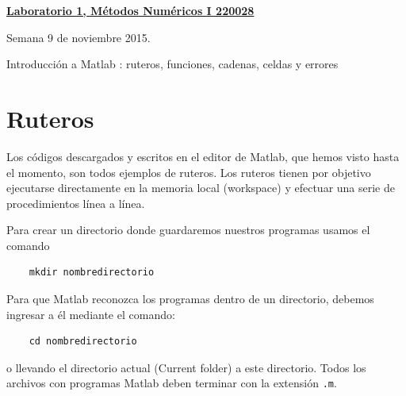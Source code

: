 \documentclass[11pt]{article}
\begin{document}
\hspace*{-1,5cm}

\vspace*{0.5cm} \centerline {\bf\underline{Laboratorio 1, M\'etodos Num\'ericos I 220028 }}
\centerline{\textrm{Semana 9 de noviembre 2015.}}  \vspace{0.2cm}




\centerline{Introducci\'on  a Matlab \circledR:  ruteros, funciones, cadenas, celdas y errores} 
%


\section{Ruteros}
  Los c\'odigos descargados y escritos en el editor de Matlab, que hemos visto hasta el momento,  son todos ejemplos de ruteros. Los ruteros tienen por objetivo ejecutarse directamente en la memoria local (workspace) y efectuar una serie de procedimientos l\'inea a l\'inea.
  
Para crear un directorio donde guardaremos nuestros programas usamos el comando
\begin{verbatim}
	mkdir nombredirectorio
\end{verbatim}
Para que Matlab reconozca los programas dentro de un directorio, debemos ingresar a \'el mediante el comando:
\begin{verbatim}
	cd nombredirectorio
\end{verbatim}
o llevando el directorio actual (Current folder) a este directorio. Todos los archivos con programas Matlab deben terminar con la extensi\'on \texttt{.m}. 
  
\end{document}
